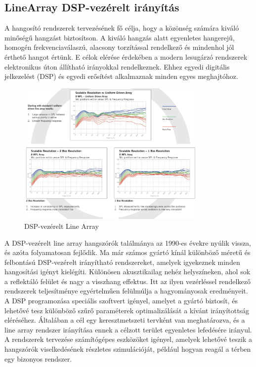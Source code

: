\subsection{LineArray DSP-vezérelt irányítás~\cite{AHNERT2023}}
A hangosító rendszerek tervezésének fő célja, hogy a közönség számára kiváló minőségű hangzást biztosítson. 
A kiváló hangzás alatt egyenletes hangerejű, homogén frekvenciaválaszú, alacsony torzítással rendelkező és mindenhol jól érthető hangot értünk. 
E célok elérése érdekében a modern lesugárzó rendszerek elektronikus úton állítható irányokkal rendelkeznek. 
Ehhez egyedi digitális jelkezelést (DSP) és egyedi erősítést alkalmaznak minden egyes meghajtóhoz.
\begin{figure}[H]
    \centering
    \includegraphics[width=350px, keepaspectratio]{figures/dsp_arrays.png}
    \caption{DSP-vezérelt Line Array~\cite{AHNERT2023}}
    \label{fig:dsp_arrays}
\end{figure}
A DSP-vezérelt line array hangszórók találmánya az 1990-es évekre nyúlik vissza, és azóta folyamatosan fejlődik.
Ma már számos gyártó kínál különböző méretű és felbontású DSP-vezérelt irányítható rendszereket, 
amelyek igyekeznek minden hangosítási igényt kielégíti. 
Különösen akusztikailag nehéz helyszíneken, ahol sok a reflektáló felület és nagy a visszhang effektus. 
Itt az ilyen vezérléssel rendelkező rendszerek teljesítménye egyértelműen felülmúlja a hagyományosak eredményeit. 
A DSP programozása speciális szoftvert igényel, amelyet a gyártó biztosít, és lehetővé tesz különböző szűrő paraméterek optimalizálását a kívánt irányítottság eléréséhez. 
Általában a cél egy keresztmetszeti tervként van meghatározva, és a line array rendszer irányítása ennek a célzott terület egyenletes lefedésére irányul.
A rendszerek tervezése számítógépes eszközöket igényel, amelyek lehetővé teszik a hangszórók viselkedésének részletes szimulációját, például hogyan reagál a térben egy bizonyos rendszer.

